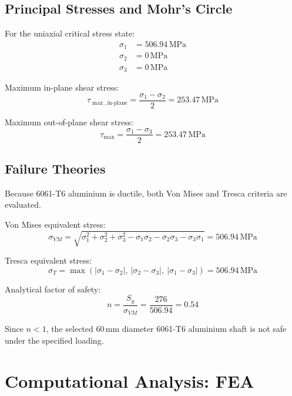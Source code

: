 \documentclass[12pt,a4paper]{article}
\newcommand{\SI}[2]{#1\,\ensuremath{\mathrm{#2}}}
\begin{document}
\subsection{Principal Stresses and Mohr's Circle}

For the uniaxial critical stress state:
\begin{align}
\sigma_1 &= \SI{506.94}{MPa} \\
\sigma_2 &= \SI{0}{MPa} \\
\sigma_3 &= \SI{0}{MPa}
\end{align}

Maximum in-plane shear stress:
\begin{equation}
\tau_{\max,\text{in-plane}} = \frac{\sigma_1-\sigma_2}{2} = \SI{253.47}{MPa}
\end{equation}

Maximum out-of-plane shear stress:
\begin{equation}
\tau_{\max} = \frac{\sigma_1-\sigma_3}{2} = \SI{253.47}{MPa}
\end{equation}

\subsection{Failure Theories}

Because 6061-T6 aluminium is ductile, both Von Mises and Tresca criteria are evaluated.

Von Mises equivalent stress:
\begin{equation}
\sigma_{VM}=
\sqrt{\sigma_1^2+\sigma_2^2+\sigma_3^2-\sigma_1\sigma_2-\sigma_2\sigma_3-\sigma_3\sigma_1}
=\SI{506.94}{MPa}
\end{equation}

Tresca equivalent stress:
\begin{equation}
\sigma_T=\max\left(|\sigma_1-\sigma_2|,\ |\sigma_2-\sigma_3|,\ |\sigma_1-\sigma_3|\right)
=\SI{506.94}{MPa}
\end{equation}

Analytical factor of safety:
\begin{equation}
n=\frac{S_y}{\sigma_{VM}}=\frac{276}{506.94}=0.54
\end{equation}

Since \(n<1\), the selected \SI{60}{mm} diameter 6061-T6 aluminium shaft is not safe under the specified loading.

\section{Computational Analysis: FEA}
\end{document}
